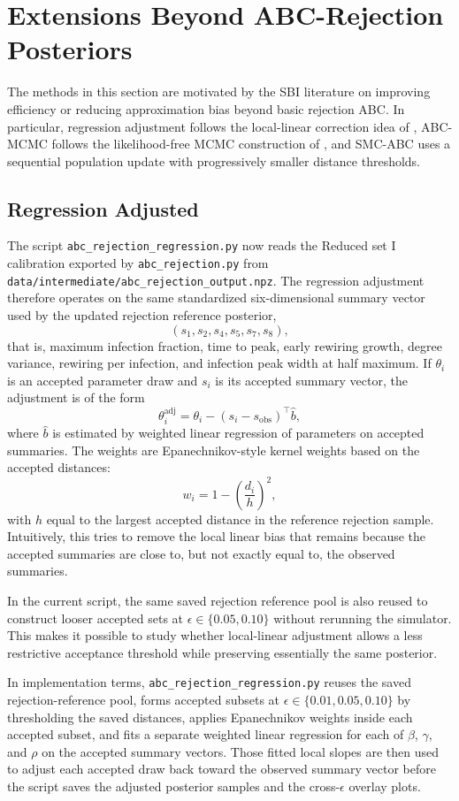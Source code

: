 \documentclass[11pt]{article}
\begin{document}
\section{Extensions Beyond ABC-Rejection Posteriors}

The methods in this section are motivated by the SBI literature on improving efficiency or reducing approximation bias beyond basic rejection ABC. In particular, regression adjustment follows the local-linear correction idea of \citet{beaumont2002}, ABC-MCMC follows the likelihood-free MCMC construction of \citet{marjoram2003}, and SMC-ABC uses a sequential population update with progressively smaller distance thresholds.

\subsection{Regression Adjusted}

The script \texttt{abc\_rejection\_regression.py} now reads the Reduced set I calibration exported by \texttt{abc\_rejection.py} from \texttt{data/intermediate/abc\_rejection\_output.npz}. The regression adjustment therefore operates on the same standardized six-dimensional summary vector used by the updated rejection reference posterior,
\[
(s_1,s_2,s_4,s_5,s_7,s_8),
\]
that is, maximum infection fraction, time to peak, early rewiring growth, degree variance, rewiring per infection, and infection peak width at half maximum. If $\theta_i$ is an accepted parameter draw and $s_i$ is its accepted summary vector, the adjustment is of the form
\[
\theta_i^{\text{adj}} = \theta_i - (s_i - s_{\text{obs}})^\top \widehat{b},
\]
where $\widehat{b}$ is estimated by weighted linear regression of parameters on accepted summaries. The weights are Epanechnikov-style kernel weights based on the accepted distances:
\[
w_i = 1 - \left(\frac{d_i}{h}\right)^2,
\]
with $h$ equal to the largest accepted distance in the reference rejection sample. Intuitively, this tries to remove the local linear bias that remains because the accepted summaries are close to, but not exactly equal to, the observed summaries.

In the current script, the same saved rejection reference pool is also reused to construct looser accepted sets at $\epsilon \in \{0.05,0.10\}$ without rerunning the simulator. This makes it possible to study whether local-linear adjustment allows a less restrictive acceptance threshold while preserving essentially the same posterior.

In implementation terms, \texttt{abc\_rejection\_regression.py} reuses the saved rejection-reference pool, forms accepted subsets at $\epsilon \in \{0.01,0.05,0.10\}$ by thresholding the saved distances, applies Epanechnikov weights inside each accepted subset, and fits a separate weighted linear regression for each of $\beta$, $\gamma$, and $\rho$ on the accepted summary vectors. Those fitted local slopes are then used to adjust each accepted draw back toward the observed summary vector before the script saves the adjusted posterior samples and the cross-$\epsilon$ overlay plots.
\end{document}
